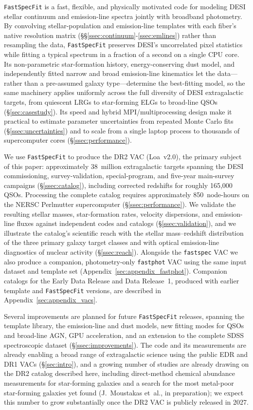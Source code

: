 \documentclass[modern,linenumbers]{aastex701}
\newcommand{\fastspecfit}{\texttt{FastSpecFit}}
\newcommand{\fastspec}{\texttt{fastspec}}
\newcommand{\fastphot}{\texttt{fastphot}}
\begin{document}
\fastspecfit{} is a fast, flexible, and physically motivated code for
modeling DESI stellar continuum and emission-line spectra jointly with
broadband photometry. By convolving stellar-population and
emission-line templates with each fiber's native resolution matrix
(\S\S\ref{ssec:continuum}-\ref{ssec:emlines}) rather than resampling
the data, \fastspecfit{} preserves DESI's uncorrelated pixel
statistics while fitting a typical spectrum in a fraction of a second
on a single CPU core. Its non-parametric star-formation history,
energy-conserving dust model, and independently fitted narrow and
broad emission-line kinematics let the data---rather than a
pre-assumed galaxy type---determine the best-fitting model, so the
same machinery applies uniformly across the full diversity of DESI
extragalactic targets, from quiescent LRGs to star-forming ELGs to
broad-line QSOs (\S\ref{sec:casestudy}). Its speed and hybrid
MPI/multiprocessing design make it practical to estimate parameter
uncertainties from repeated Monte Carlo fits (\S\ref{ssec:uncertainties})
and to scale from a single laptop process to thousands of
supercomputer cores (\S\ref{ssec:performance}).

We use \fastspecfit{} to produce the DR2 VAC (Loa~v2.0), the primary
subject of this paper: approximately 38~million extragalactic targets
spanning the DESI commissioning, survey-validation, special-program,
and five-year main-survey campaigns (\S\ref{ssec:catalog}), including
corrected redshifts for roughly 165,000 QSOs. Processing the complete
catalog requires approximately 850~node-hours on the NERSC Perlmutter
supercomputer (\S\ref{ssec:performance}). We validate the resulting
stellar masses, star-formation rates, velocity dispersions, and
emission-line fluxes against independent codes and catalogs
(\S\ref{ssec:validation}), and we illustrate the catalog's scientific
reach with the stellar mass--redshift distribution of the three
primary galaxy target classes and with optical emission-line
diagnostics of nuclear activity (\S\ref{ssec:reach}). Alongside the
\fastspec{} VAC we also produce a companion, photometry-only
\fastphot{} VAC using the same input dataset and template set
(Appendix~\ref{sec:appendix_fastphot}). Companion catalogs for the
Early Data Release and Data Release~1, produced with earlier template
and \fastspecfit{} versions, are described in
Appendix~\ref{sec:appendix_vacs}.

Several improvements are planned for future \fastspecfit{} releases,
spanning the template library, the emission-line and dust models, new
fitting modes for QSOs and broad-line AGN, GPU acceleration, and an
extension to the complete SDSS spectroscopic dataset
(\S\ref{ssec:improvements}). The code and its measurements are already
enabling a broad range of extragalactic science using the public EDR
and DR1 VACs (\S\ref{sec:intro}), and a growing number of studies are
already drawing on the DR2 catalog described here, including
direct-method chemical abundance measurements for star-forming
galaxies \citep{scholte26a} and a search for the most metal-poor
star-forming galaxies yet found (J.~Moustakas et~al., in preparation);
we expect this number to grow substantially once the DR2 VAC is
publicly released in 2027.
\end{document}
